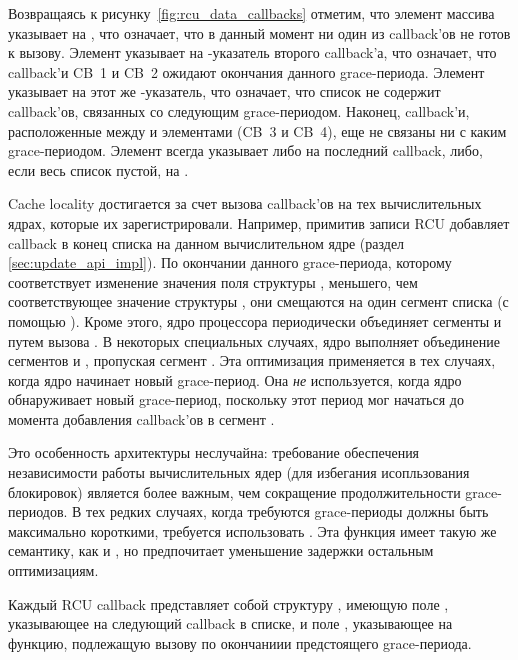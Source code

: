 Возвращаясь к рисунку~\ref{fig:rcu_data_callbacks} отметим,
что элемент массива  указывает на ,
что означает, что в данный момент ни один из callback'ов не готов к вызову.
Элемент  указывает на -указатель
второго callback'а, что означает, что callback'и CB~1 и CB~2 ожидают окончания данного
grace-периода.
Элемент  указывает на этот же
-указатель, что означает, что список не содержит callback'ов,
связанных со следующим grace-периодом.
Наконец, callback'и, расположенные между  и
 элементами (CB~3 и CB~4),
еще не связаны ни с каким grace-периодом.
Элемент  всегда указывает либо на последний callback,
либо, если весь список пустой, на .

Cache locality достигается за счет вызова callback'ов на тех вычислительных ядрах,
которые их зарегистрировали.
Например, примитив записи RCU  добавляет
callback  в конец списка 
на данном вычислительном ядре (раздел \ref{sec:update_api_impl}).
По окончании данного grace-периода, которому соответствует изменение значения
поля  структуры , меньшего, чем соответствующее значение
структуры , они смещаются на один сегмент списка
(с помощью ).
Кроме этого, ядро процессора периодически объединяет сегменты 
и  путем вызова .
В некоторых специальных случаях, ядро выполняет объединение сегментов
 и , пропуская сегмент .
Эта оптимизация применяется в тех случаях, когда ядро начинает новый grace-период.
Она \emph{не} используется, когда ядро обнаруживает новый grace-период,
поскольку этот период мог начаться до момента добавления callback'ов
в сегмент .

Это особенность архитектуры неслучайна: требование обеспечения
независимости работы вычислительных ядер
(для избегания исопльзования блокировок) является более важным,
чем сокращение продолжительности grace-периодов.
В тех редких случаях, когда требуются grace-периоды должны быть
максимально короткими, требуется использовать .
Эта функция имеет такую же семантику, как и ,
но предпочитает уменьшение задержки остальным оптимизациям.

Каждый RCU callback представляет собой структуру ,
имеющую поле , указывающее на следующий callback в списке,
и поле , указывающее на функцию, подлежащую вызову
по окончаниии предстоящего grace-периода.
